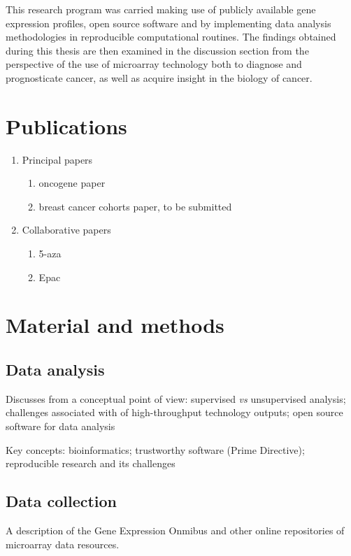 \documentclass[11pt]{article}
\begin{document}
This research program was carried making use of publicly available gene
expression profiles, open source software and by implementing data analysis
methodologies in reproducible computational routines. The findings obtained
during this thesis are then examined in the discussion section from the
perspective of the use of microarray technology both to diagnose and
prognosticate cancer, as well as acquire insight in the biology of cancer.

\section{Publications}
\label{sec-2}
\begin{enumerate}
\item Principal papers
\label{sec-2-0-0-0-1}
\begin{enumerate}
\item oncogene paper
\item breast cancer cohorts paper, to be submitted
\end{enumerate}

\item Collaborative papers
\label{sec-2-0-0-0-2}
\begin{enumerate}
\item 5-aza
\item Epac
\end{enumerate}
\end{enumerate}

\section{Material and methods}
\label{sec-3}
\subsection{Data analysis}
\label{sec-3-1}
Discusses from a conceptual point of view: supervised \emph{vs} unsupervised
analysis; challenges associated with of high-throughput technology outputs; open
source software for data analysis

Key concepts: bioinformatics; trustworthy software (Prime Directive);
reproducible research and its challenges

\subsection{Data collection}
\label{sec-3-2}
A description of the Gene Expression Onmibus and other online repositories of
microarray data resources.
\end{document}
